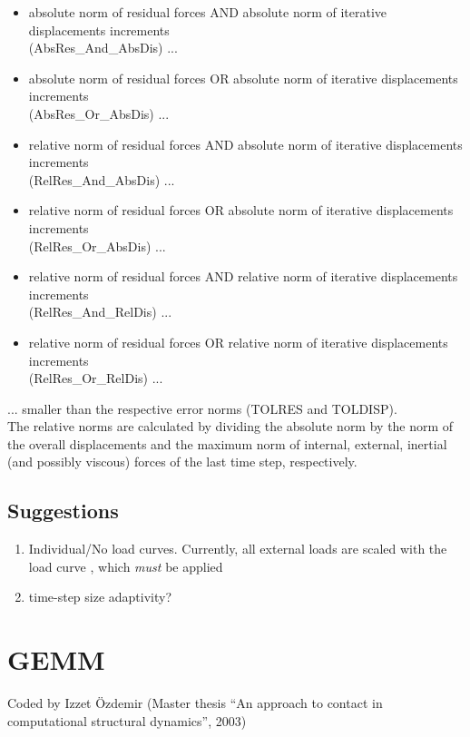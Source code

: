 \begin{itemize}
\item absolute norm of residual forces AND absolute norm of iterative displacements increments \\(AbsRes\_And\_AbsDis) ...
\item absolute norm of residual forces OR absolute norm of iterative displacements increments  \\(AbsRes\_Or\_AbsDis)  ...
\item relative norm of residual forces AND absolute norm of iterative displacements increments \\(RelRes\_And\_AbsDis) ...
\item relative norm of residual forces OR absolute norm of iterative displacements increments  \\(RelRes\_Or\_AbsDis)  ... 
\item relative norm of residual forces AND relative norm of iterative displacements increments \\(RelRes\_And\_RelDis) ... 
\item relative norm of residual forces OR relative norm of iterative displacements increments  \\(RelRes\_Or\_RelDis)  ...
\end{itemize}

... smaller than the respective error norms (TOLRES and TOLDISP).\\

\noindent The relative norms are calculated by dividing the absolute norm by the norm of the overall displacements and the maximum norm of internal, external, inertial (and possibly viscous) forces of the last time step, respectively.

\subsection{Suggestions}
\begin{enumerate}
\item Individual/No load curves. Currently, all external loads are scaled with
  the load curve , which \emph{must} be applied
\item time-step size adaptivity?
\end{enumerate}

\section{GEMM}
Coded by Izzet \"{O}zdemir (Master thesis ``An approach to contact in
computational structural dynamics'', 2003)

